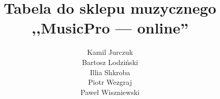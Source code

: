 \documentclass[a4page]{article}
\begin{document}
	\begin{titlepage}
		\title{Tabela do sklepu muzycznego ,,MusicPro --- online''\\}
		\author{Kamil Jurczuk \\ Bartosz Lodziński \\ Illia Shkroba \\ Piotr Wezgraj \\Paweł Wiszniewski}
		\makeatletter
			\centering
			{
				{\Huge{\@title}}
				\vspace{5cm}
				{\LARGE{\@author}}
			}
		\makeatother

	\end{titlepage}

	\begin{table}
	\newcommand\next{\stepcounter{rownumber}\arabic{rownumber}}
		\begin{adjustwidth}{-4.5cm}{}
			\begin{tabular}{|c|c|c|c|}
			

\end{tabular}
\end{adjustwidth}
\end{table}
\end{document}
